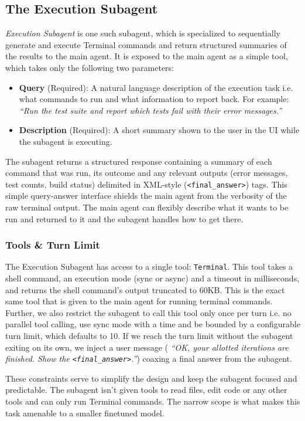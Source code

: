 \documentclass[sigconf,review]{acmart}
\begin{document}
\subsection{The Execution Subagent}
\textit{Execution Subagent} is one such subagent, which is specialized to sequentially generate and execute Terminal commands and return structured summaries of the results to the main agent. It is exposed to the main agent as a simple tool, which takes only the following two parameters:
\begin{itemize}
   \item \textbf{Query} (Required): A natural language description of the execution task i.e. what commands to run and what information to report back. For example: \textit{``Run the test suite and report which tests fail with their error messages.''}
   \item \textbf{Description} (Required): A short summary shown to the user in the UI while the subagent is executing.
\end{itemize}

The subagent returns a structured response containing a summary of each command that was run, its outcome and any relevant outputs (error messages, test counts, build status) delimited in XML-style (\texttt{<final\_answer>}) tags. This simple query-answer interface shields the main agent from the verbosity of the raw terminal output. The main agent can flexibly describe what it wants to be run and returned to it and the subagent handles how to get there.

\subsubsection{Tools \& Turn Limit}
The Execution Subagent has access to a single tool: \texttt{Terminal}. This tool takes a shell command, an execution mode (sync or async) and a timeout in milliseconds, and returns the shell command's output truncated to 60KB. This is the exact same tool that is given to the main agent for running terminal commands. Further, we also restrict the subagent to call this tool only once per turn i.e. no parallel tool calling, use sync mode with a time and be bounded by a configurable turn limit, which defaults to 10. If we reach the turn limit without the subagent exiting on its own, we inject a user message ( \textit{``OK, your allotted iterations are finished. Show the \texttt{<final\_answer>}.''}) coaxing a final answer from the subagent.

These constraints serve to simplify the design and keep the subagent focused and predictable. The subagent isn't given tools to read files, edit code or any other tools and can only run Terminal commands. The narrow scope is what makes this task amenable to a smaller finetuned model.
\end{document}
